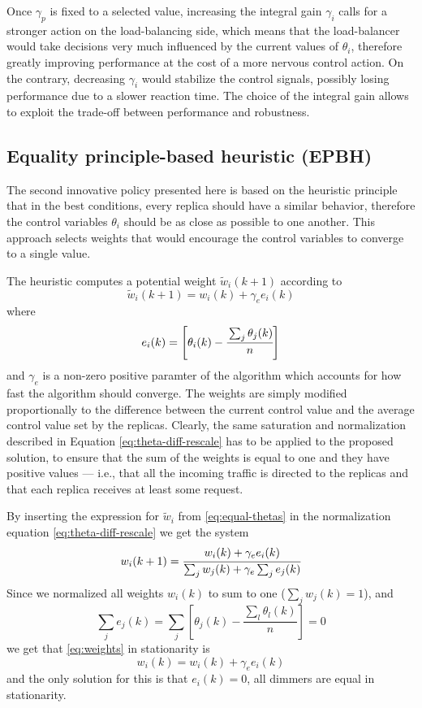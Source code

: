 Once $\gamma_p$ is fixed to a selected value, increasing the integral
gain $\gamma_i$ calls for a stronger action on the load-balancing
side, which means that the load-balancer would take decisions very
much influenced by the current values of $\theta_i$, therefore greatly
improving performance at the cost of a more nervous control action. On
the contrary, decreasing $\gamma_i$ would stabilize the control
signals, possibly losing performance due to a slower reaction
time. The choice of the integral gain allows to exploit the trade-off
between performance and robustness.

\subsection{Equality principle-based heuristic (EPBH)}

The second innovative policy presented here is based on the heuristic
principle that in the best conditions, every replica should have a
similar behavior, therefore the control variables $\theta_i$ should be
as close as possible to one another. This approach selects weights
that would encourage the control variables to converge to a single
value.

The heuristic computes a potential weight $\tilde{w}_i(k+1)$ according
to
\begin{equation}
  \tilde{w}_i(k+1) = w_i(k) + \gamma_e e_i(k)
\label{eq:equal-thetas}
\end{equation}
where
$$e_i(k)=\left[ \theta_i (k) - \cfrac{\sum_j \theta_j (k) }{n} \right]$$
and $\gamma_e$ is a non-zero positive paramter of the algorithm which accounts
for how fast the algorithm should converge. The weights are simply modified
proportionally to the difference between the current control value and
the average control value set by the replicas. Clearly, the same
saturation and normalization described in Equation
\eqref{eq:theta-diff-rescale} has to be applied to the proposed
solution, to ensure that the sum of the weights is equal to one and
they have positive values --- i.e., that all the incoming traffic is
directed to the replicas and that each replica receives at least some
request.

By inserting the expression for $\tilde w_i$ from \eqref{eq:equal-thetas}
in the normalization equation \eqref{eq:theta-diff-rescale} we get the system
\begin{equation}
  w_i(k+1)=\cfrac{w_i(k)+\gamma_ee_i(k)}{\sum_jw_j(k)+\gamma_e\sum_je_j(k)}
\label{eq:weights}
\end{equation}
Since we normalized all weights $w_i(k)$ to sum to one ($\sum_jw_j(k)=1$), and
$$\sum_je_j(k)=\sum_j\left[\theta_j(k)-\frac{\sum_l\theta_l(k)}{n}\right]=0$$
we get that \eqref{eq:weights} in stationarity is
$$w_i(k)=w_i(k)+\gamma_ee_i(k)$$
and the only solution for this is that $e_i(k)=0$, all dimmers are equal in
stationarity.

